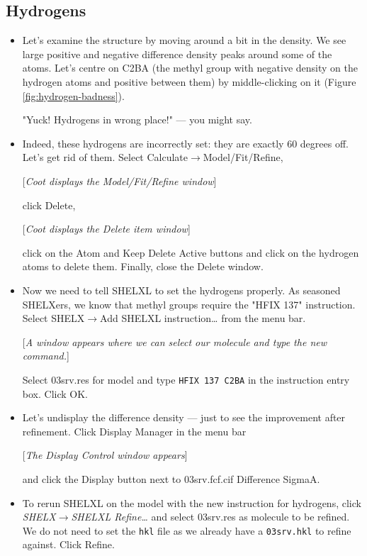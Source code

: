 \documentclass{article}
\begin{document}
\subsection{Hydrogens}
\begin{itemize}
\item Let's examine the structure by moving around a bit in the
  density. We see large positive and negative difference density peaks
  around some of the atoms. Let's centre on C2BA (the methyl group
  with negative density on the hydrogen atoms and positive between
  them) by middle-clicking on it (Figure \ref{fig:hydrogen-badness}).

"Yuck! Hydrogens in wrong place!" --- you might say.

\item Indeed, these hydrogens are incorrectly set: they are exactly 60
  degrees off. Let's get rid of them. Select
  \textsf{Calculate$\to$Model/Fit/Refine},

[\textsl{Coot displays the Model/Fit/Refine window}]

click \textsf{Delete}, 

[\textsl{Coot displays the Delete item window}]

click on the \textsf{Atom} and \textsf{Keep Delete Active} buttons and
click on the hydrogen atoms to delete them. Finally, close the
\textsf{Delete} window.

\item Now we need to tell SHELXL to set the hydrogens properly. As
  seasoned SHELXers, we know that methyl groups require the "HFIX 137"
  instruction. Select \textsf{SHELX$\to$Add SHELXL instruction\ldots}
  from the menu bar.

[\textsl{A window appears where we can select our molecule and type the new command.}]

Select 03srv.res for model and type \texttt{HFIX 137 C2BA} in the
instruction entry box. Click \textsf{OK}.

\item Let's undisplay the difference density --- just to see the
  improvement after refinement. Click \textsf{Display Manager} in the
  menu bar

[\textsl{The Display Control window appears}]

and click the \textsf{Display} button next to \textsf{03srv.fcf.cif Difference SigmaA}.

\item To rerun SHELXL on the model with the new instruction for
  hydrogens, click \textsl{SHELX$\to$SHELXL Refine\ldots} and select
  03srv.res as molecule to be refined. We do not need to set the
  \texttt{hkl} file as we already have a \texttt{03srv.hkl} to refine
  against. Click \textsf{Refine}.


\end{itemize}
\end{document}
